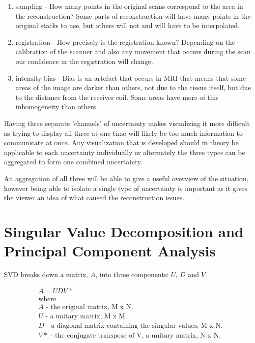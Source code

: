 \begin{enumerate}
	\item sampling - How many points in the original scans correspond to the area in the reconstruction? Some parts of reconstruction will have many points in the original stacks to use, but others will not and will have to be interpolated.
	\item registration - How precisely is the registration known? Depending on the calibration of the scanner and also any movement that occurs during the scan our confidence in the registration will change.
	\item intensity bias - Bias is an artefact that occurs in MRI that means that some areas of the image are darker than others, not due to the tissue itself, but due to the distance from the receiver coil. Some areas have more of this inhomogeneity than others.
\end{enumerate}

Having three separate 'channels' of uncertainty makes visualizing it more difficult as trying to display all three at one time will likely be too much information to communicate at once. Any visualization that is developed should in theory be applicable to each uncertainty individually or alternately the three types can be aggregated to form one combined uncertainty.

An aggregation of all three will be able to give a useful overview of the situation, however being able to isolate a single type of uncertainty is important as it gives the viewer an idea of what caused the reconstruction issues.

\newpage
\section{Singular Value Decomposition and Principal Component Analysis}\label{background:svdpca}
SVD breaks down a matrix, $A$, into three components: $U$, $D$ and $V$.

\begin{align}
& A = UDV* \nonumber \\
& \text{where} \nonumber \\
& A \text{ - the original matrix, M x N.} \nonumber \\
& U \text{ - a unitary matrix, M x M.} \nonumber \\
& D \text{ - a diagonal matrix containing the singular values, M x N.} \nonumber \\
& V* \text{ - the conjugate transpose of V, a unitary matrix, N x N.} \nonumber
\end{align}

